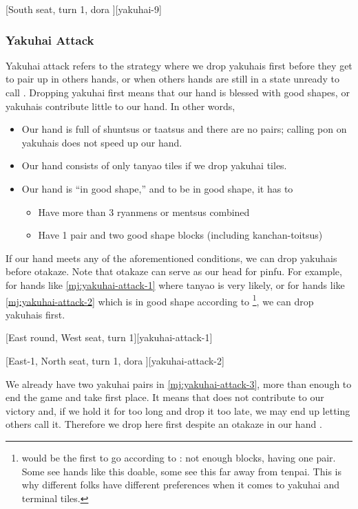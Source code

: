 \documentclass[12pt]{article}
\newlength\stdbls %
\newcommand{\mjfn}[1]{\raisebox{-.135\stdbls}{\mahjong[0.75\stdbls]{#1}}}
\begin{document}
[South seat, turn 1, dora ][yakuhai-9]


\subsubsection*{Yakuhai Attack}

Yakuhai attack refers to the strategy where we drop yakuhais first before they get to pair up in others hands, or when others hands are still in a state unready to call \citep[][pp.~16--17]{zero-teyaku}. Dropping yakuhai first means that our hand is blessed with good shapes, or yakuhais contribute little to our hand. In other words,

\begin{itemize}
  \item Our hand is full of shuntsus or taatsus and there are no pairs; calling pon on yakuhais does not speed up our hand.
  \item Our hand consists of only tanyao tiles if we drop yakuhai tiles.
  \item Our hand is ``in good shape,'' and to be in good shape, it has to
  \begin{itemize}
    \item Have more than 3 ryanmens or mentsus combined \citep[][p.~17]{zero-teyaku}
    \item Have 1 pair and two good shape blocks (including kanchan-toitsus) \citep{senba-yakuhai}
  \end{itemize}
\end{itemize}

If our hand meets any of the aforementioned conditions, we can drop yakuhais before otakaze. Note that otakaze can serve as our head for pinfu. For example, for hands like \ref{mj:yakuhai-attack-1} where tanyao is very likely, or for hands like \ref{mj:yakuhai-attack-2} which is in good shape according to \citet{senba-yakuhai}\footnote{\mjfn{1s} would be the first to go according to \citet{yuusee-yakuand1}: not enough blocks, having one pair. Some see hands like this doable, some see this far away from tenpai. This is why different folks have different preferences when it comes to yakuhai and terminal tiles.}, we can drop yakuhais first.

[East round, West seat, turn 1][yakuhai-attack-1]

[East-1, North seat, turn 1, dora ][yakuhai-attack-2]

We already have two yakuhai pairs in \ref{mj:yakuhai-attack-3}, more than enough to end the game and take first place. It means that  does not contribute to our victory and, if we hold it for too long and drop it too late, we may end up letting others call it. Therefore we drop  here first despite an otakaze  in our hand \citep[][pp.~181--182]{kawamura-naki}.
\end{document}
